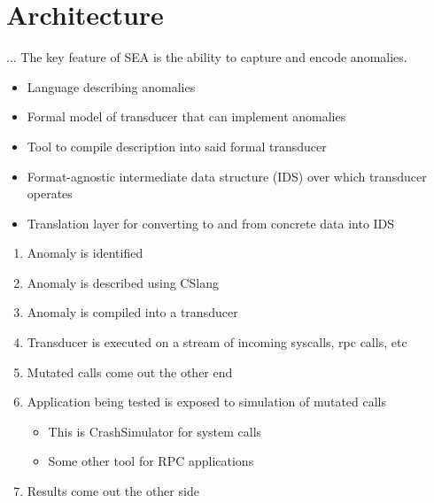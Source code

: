 \section{Architecture}
\label{SEC:architecture}

... The key feature of SEA is the ability to capture and encode anomalies.

\begin{itemize}
  \item{Language describing anomalies}
  \item{Formal model of transducer that can implement anomalies}
  \item{Tool to compile description into said formal transducer}
  \item{Format-agnostic intermediate data structure (IDS) over which transducer
  operates}
  \item{Translation layer for converting to and from concrete data into IDS}
\end{itemize}


\begin{enumerate}
\item{Anomaly is identified}
\item{Anomaly is described using CSlang}
\item{Anomaly is compiled into a transducer}
\item{Transducer is executed on a stream of incoming syscalls, rpc calls, etc}
\item{Mutated calls come out the other end}
\item{Application being tested is exposed to simulation of mutated calls}
\begin{itemize}
\item{This is CrashSimulator for system calls}
\item{Some other tool for RPC applications}
\end{itemize}
\item{Results come out the other side}

\end{enumerate}
